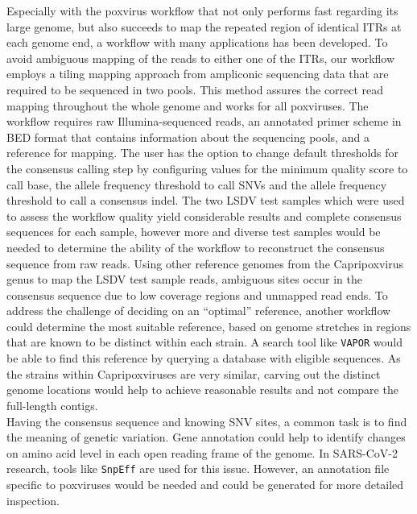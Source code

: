 Especially with the poxvirus workflow that not only performs fast regarding its large genome, but also succeeds to map the repeated region of identical \acp{ITR} at each genome end, a workflow with many applications has been developed. To avoid ambiguous mapping of the reads to either one of the \acp{ITR}, our workflow employs a tiling mapping approach from ampliconic sequencing data that are required to be sequenced in two pools. This method assures the correct read mapping throughout the whole genome and works for all poxviruses. The workflow requires raw Illumina-sequenced reads, an annotated primer scheme in \ac{BED} format that contains information about the sequencing pools, and a reference for mapping. The user has the option to change default thresholds for the consensus calling step by configuring values for the minimum quality score to call base, the allele frequency threshold to call \acp{SNV} and the allele frequency threshold to call a consensus indel. The two \ac{LSDV} test samples which were used to assess the workflow quality yield considerable results and complete consensus sequences for each sample, however more and diverse test samples would be needed to determine the ability of the workflow to reconstruct the consensus sequence from raw reads. Using other reference genomes from the Capripoxvirus genus to map the \ac{LSDV} test sample reads, ambiguous sites occur in the consensus sequence due to low coverage regions and unmapped read ends. To address the challenge of deciding on an ``optimal'' reference, another workflow could determine the most suitable reference, based on genome stretches in regions that are known to be distinct within each strain. A search tool like \texttt{VAPOR} would be able to find this reference by querying a database with eligible sequences. As the strains within Capripoxviruses are very similar, carving out the distinct genome locations would help to achieve reasonable results and not compare the full-length contigs.\\
Having the consensus sequence and knowing \ac{SNV} sites, a common task is to find the meaning of genetic variation. Gene annotation could help to identify changes on amino acid level in each open reading frame of the genome. In \ac{SARS-CoV-2} research, tools like \texttt{SnpEff} are used for this issue. However, an annotation file specific to poxviruses would be needed and could be generated for more detailed inspection.

